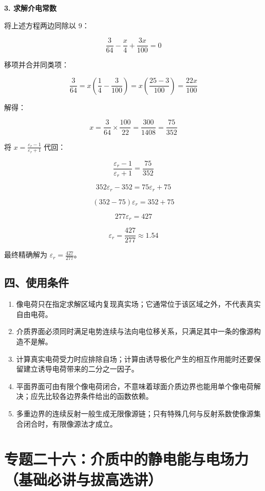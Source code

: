 \textbf{3. 求解介电常数}

将上述方程两边同除以 \(9\)：

\[
\frac{3}{64} - \frac{x}{4} + \frac{3x}{100} = 0
\]

移项并合并同类项：

\[
\frac{3}{64} = x \left( \frac{1}{4} - \frac{3}{100} \right) = x \left( \frac{25 - 3}{100} \right) = \frac{22x}{100}
\]

解得：

\[
x = \frac{3}{64} \times \frac{100}{22} = \frac{300}{1408} = \frac{75}{352}
\]

将 \(x = \frac{\varepsilon_r - 1}{\varepsilon_r + 1}\) 代回：

\[
\frac{\varepsilon_r - 1}{\varepsilon_r + 1} = \frac{75}{352}
\]

\[
352\varepsilon_r - 352 = 75\varepsilon_r + 75
\]

\[
(352 - 75)\varepsilon_r = 352 + 75
\]

\[
277\varepsilon_r = 427
\]

\[
\varepsilon_r = \frac{427}{277} \approx 1.54
\]

最终精确解为 \(\varepsilon_r = \frac{427}{277}\)。

\subsection{四、使用条件}\label{m3:ux56dbux4f7fux7528ux6761ux4ef6}

\begin{enumerate}
\def\labelenumi{\arabic{enumi}.}
\tightlist
\item
  像电荷只在指定求解区域内复现真实场；它通常位于该区域之外，不代表真实自由电荷。
\item
  介质界面必须同时满足电势连续与法向电位移关系，只满足其中一条的像源构造不是解。
\item
  计算真实电荷受力时应排除自场；计算由诱导极化产生的相互作用能时还要保留建立诱导电荷带来的二分之一因子。
\item
  平面界面可由有限个像电荷闭合，不意味着球面介质边界也能用单个像电荷解决；应先比较各边界条件给出的函数依赖。
\item
  多重边界的连续反射一般生成无限像源链；只有特殊几何与反射系数使像源集合闭合时，有限像源法才成立。
\end{enumerate}

\section{专题二十六：介质中的静电能与电场力（基础必讲与拔高选讲）}\label{m3:ux4e13ux9898ux4e8cux5341ux516dux4ecbux8d28ux4e2dux7684ux9759ux7535ux80fdux4e0eux7535ux573aux529bux57faux7840ux5fc5ux8bb2ux4e0eux62d4ux9ad8ux9009ux8bb2}

